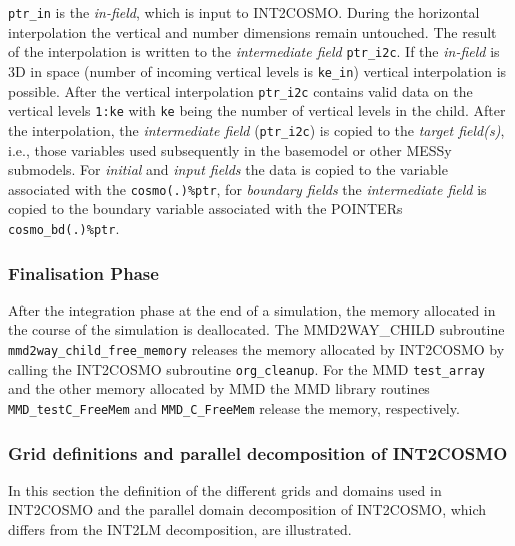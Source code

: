 \documentclass[11pt,twoside]{article}
\begin{document}
\verb|ptr_in| is the \textit{in-field}, which is input to INT2COSMO.
During the horizontal interpolation the vertical and number dimensions remain
untouched. The result of the interpolation is written to the \textit{intermediate
field} \verb|ptr_i2c|.  
If the \textit{in-field} is 3D in space (number of incoming
vertical levels is \verb|ke_in|) vertical interpolation is possible. After the
vertical interpolation \verb|ptr_i2c| contains valid data on the vertical levels
\verb|1:ke| with \verb|ke| being the number of vertical levels in the child.
 After the interpolation, the \textit{intermediate field} (\verb|ptr_i2c|) is
copied to the \textit{target field(s)}, i.e., those variables used subsequently
 in the basemodel or other MESSy submodels.
 For \textit{initial} and \textit{input fields} the data is copied to the
 variable
associated with the \verb|cosmo(.)%ptr|, for \textit{boundary fields} the
\textit{intermediate field} is copied to the
boundary variable associated with the {\footnotesize POINTER}s \verb|cosmo_bd(.)%ptr|.


\subsubsection{Finalisation Phase}
After the integration phase at the end of a simulation, the memory allocated in
the course of the simulation is deallocated. The MMD2WAY\_CHILD subroutine 
\verb|mmd2way_child_free_memory| releases the memory allocated by INT2COSMO by
calling 
 the INT2COSMO subroutine \verb|org_cleanup|. For the MMD \verb|test_array| and
 the other memory allocated by MMD the MMD library routines 
\verb|MMD_testC_FreeMem| and \verb|MMD_C_FreeMem| release the memory, 
respectively.

\subsubsection{Grid definitions and parallel decomposition of INT2COSMO}\label{sec:INT2COSMO}
In this section the definition of the different grids and domains used in 
INT2COSMO and the parallel domain 
decomposition of INT2COSMO, which differs from the
INT2LM decomposition, are illustrated.
\end{document}
